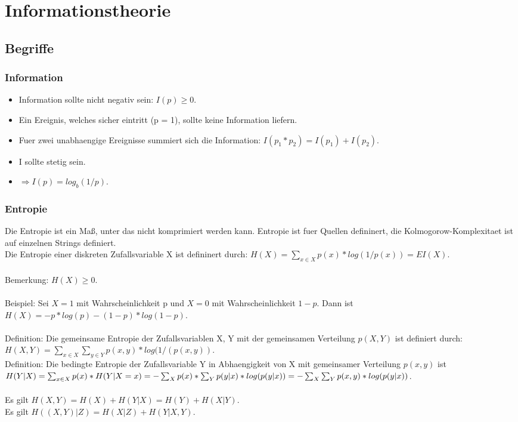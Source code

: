 \documentclass[a4paper]{scrreprt}
\begin{document}
\chapter{Informationstheorie}

\section{Begriffe}

\subsection{Information}
\begin{itemize}
	\item Information sollte nicht negativ sein: $I(p) \ge 0$.
	\item Ein Ereignis, welches sicher eintritt (p = 1), sollte keine Information liefern.
	\item Fuer zwei unabhaengige Ereignisse summiert sich die Information: $I(p_1*p_2) = I(p_1) + I(p_2)$.
	\item I sollte stetig sein.
	\item $\Rightarrow I(p) = log_b(1/p)$.
\end{itemize}

\subsection{Entropie}
Die Entropie ist ein Maß, unter das nicht komprimiert werden kann. Entropie ist fuer Quellen defininert, die Kolmogorow-Komplexitaet ist auf einzelnen Strings definiert.\\
Die Entropie einer diskreten Zufallsvariable X ist defininert durch: $H(X) = \sum_{x \in X}p(x)*log(1/p(x)) = EI(X)$.\\\\
Bemerkung: $H(X) \ge 0$.\\\\
Beispiel: Sei $X=1$ mit Wahrscheinlichkeit p und $X=0$ mit Wahrscheinlichkeit $1-p$. Dann ist $H(X) = -p*log(p) - (1-p)*log(1-p)$.\\\\
Definition: Die gemeinsame Entropie der Zufallsvariablen X, Y mit der gemeinsamen Verteilung $p(X,Y)$ ist definiert durch: $H(X,Y) = \sum_{x \in X}\sum_{y \in Y}p(x,y)*log(1/(p(x,y))$.\\
Definition: Die bedingte Entropie der Zufallsvariable Y in Abhaengigkeit von X mit gemeinsamer Verteilung $p(x,y)$ ist\\
$H(Y|X) = \sum_{x \in X}p(x)*H(Y|X = x)\\
= -\sum_X p(x)*\sum_Y p(y|x)*log(p(y|x))\\
= -\sum_X \sum_Y p(x,y)*log(p(y|x))$.\\\\
Es gilt $H(X,Y) = H(X) + H(Y|X) = H(Y) + H(X|Y)$.\\
Es gilt $H((X,Y)|Z) = H(X|Z) + H(Y|X,Y)$.
\end{document}
